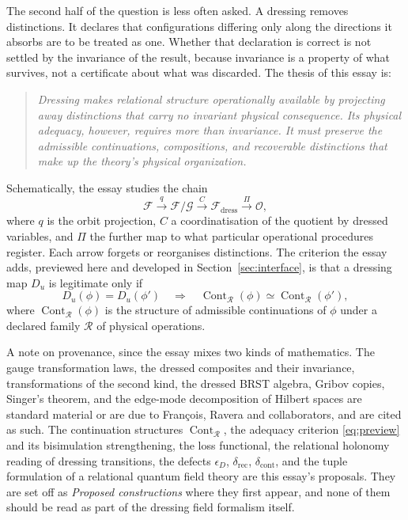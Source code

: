 \documentclass[11pt]{article}
\theoremstyle{plain}
\theoremstyle{definition}
\theoremstyle{remark}
\newcommand{\F}{\mathcal F}
\newcommand{\G}{\mathcal G}
\newcommand{\R}{\mathcal R}
\newcommand{\Cont}{\operatorname{Cont}}
\begin{document}
The second half of the question is less often asked. A dressing removes distinctions. It declares that configurations differing only along the directions it absorbs are to be treated as one. Whether that declaration is correct is not settled by the invariance of the result, because invariance is a property of what survives, not a certificate about what was discarded. The thesis of this essay is:

\begin{quote}
\emph{Dressing makes relational structure operationally available by projecting away distinctions that carry no invariant physical consequence. Its physical adequacy, however, requires more than invariance. It must preserve the admissible continuations, compositions, and recoverable distinctions that make up the theory's physical organization.}
\end{quote}

Schematically, the essay studies the chain
\begin{equation}\label{eq:chain}
\F\xrightarrow{\;q\;}\F/\G\xrightarrow{\;C\;}\F_{\mathrm{dress}}\xrightarrow{\;\Pi\;}\mathcal O,
\end{equation}
where $q$ is the orbit projection, $C$ a coordinatisation of the quotient by dressed variables, and $\Pi$ the further map to what particular operational procedures register. Each arrow forgets or reorganises distinctions. The criterion the essay adds, previewed here and developed in Section~\ref{sec:interface}, is that a dressing map $D_u$ is legitimate only if
\begin{equation}\label{eq:preview}
D_u(\phi)=D_u(\phi')\quad\Longrightarrow\quad\Cont_\R(\phi)\simeq\Cont_\R(\phi'),
\end{equation}
where $\Cont_\R(\phi)$ is the structure of admissible continuations of $\phi$ under a declared family $\R$ of physical operations.

A note on provenance, since the essay mixes two kinds of mathematics. The gauge transformation laws, the dressed composites and their invariance, transformations of the second kind, the dressed BRST algebra, Gribov copies, Singer's theorem, and the edge-mode decomposition of Hilbert spaces are standard material or are due to François, Ravera and collaborators, and are cited as such. The continuation structures $\Cont_\R$, the adequacy criterion \eqref{eq:preview} and its bisimulation strengthening, the loss functional, the relational holonomy reading of dressing transitions, the defects $\epsilon_D$, $\delta_{\mathrm{rec}}$, $\delta_{\mathrm{cont}}$, and the tuple formulation of a relational quantum field theory are this essay's proposals. They are set off as \emph{Proposed constructions} where they first appear, and none of them should be read as part of the dressing field formalism itself.
\end{document}
